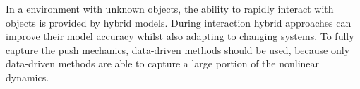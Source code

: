 In a environment with unknown objects, the ability to rapidly interact with objects is provided by hybrid models. During interaction hybrid approaches can improve their model accuracy whilst also adapting to changing systems. To fully capture the push mechanics, data-driven methods should be used, because only data-driven methods are able to capture a large portion of the nonlinear dynamics.

%
%
%

